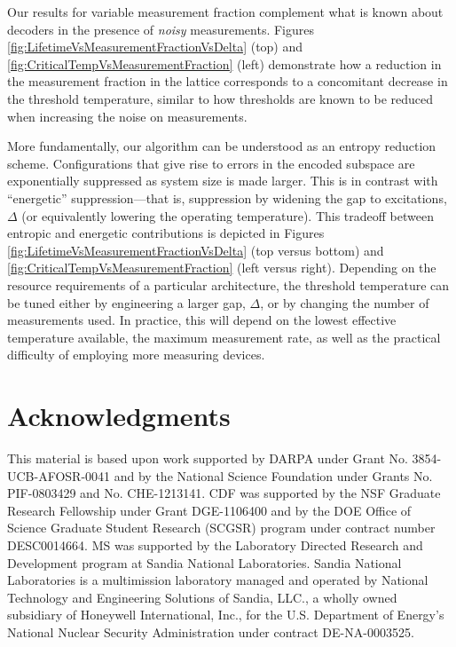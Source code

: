\documentclass[twocolumn,superscriptaddress,aps,prb,floatfix]{revtex4-1}
\renewcommand*{\emph}[1]{{\it {#1}}}
\begin{document}
Our results for variable measurement fraction complement what is known about decoders in the presence of \emph{noisy} measurements\cite{Nickerson2016}.  Figures \ref{fig:LifetimeVsMeasurementFractionVsDelta} (top) and \ref{fig:CriticalTempVsMeasurementFraction} (left) demonstrate how a reduction in the measurement fraction in the lattice corresponds to a concomitant decrease in the threshold temperature, similar to how thresholds are known to be reduced when increasing the noise on measurements.

More fundamentally, our algorithm can be understood as an entropy reduction scheme.  Configurations that give rise to errors in the encoded subspace are exponentially suppressed as system size is made larger.  This is in contrast with ``energetic'' suppression---that is, suppression by widening the gap to excitations, $\Delta$ (or equivalently lowering the operating temperature).  This tradeoff between entropic and energetic contributions is depicted in Figures \ref{fig:LifetimeVsMeasurementFractionVsDelta} (top versus bottom) and \ref{fig:CriticalTempVsMeasurementFraction} (left versus right).  Depending on the resource requirements of a particular architecture, the threshold temperature can be tuned either by engineering a larger gap, $\Delta$, or by changing the number of measurements used.  In practice, this will depend on the lowest effective temperature available, the maximum measurement rate, as well as the practical difficulty of employing more measuring devices.



\section{Acknowledgments}
This material is based upon work supported by DARPA under Grant No. 3854-UCB-AFOSR-0041 and by the National Science Foundation under Grants No. PIF-0803429 and No. CHE-1213141.  CDF was supported by the NSF Graduate Research Fellowship under Grant DGE-1106400 and by the DOE Office of Science Graduate Student Research (SCGSR) program under contract number DESC0014664. MS was supported by the Laboratory Directed Research and Development program at Sandia National Laboratories.  Sandia National Laboratories is a multimission laboratory managed and operated by National Technology and Engineering Solutions of Sandia, LLC., a wholly owned subsidiary of Honeywell International, Inc., for the U.S. Department of Energy's National Nuclear Security Administration under contract DE-NA-0003525.
\end{document}
